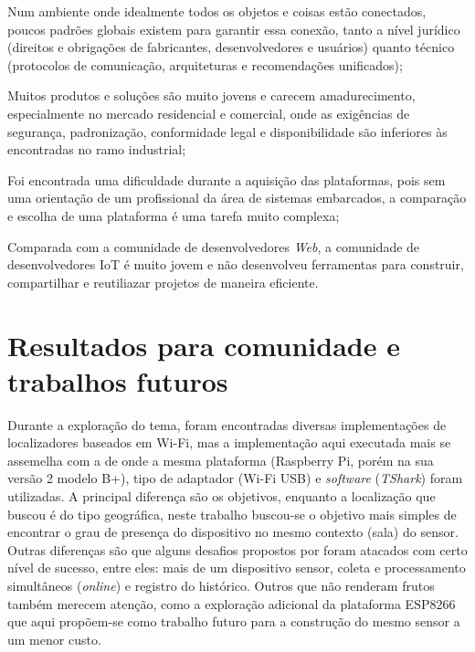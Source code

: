 \begin{alineas}
	\item Num ambiente onde
	idealmente todos os objetos e coisas estão conectados, poucos padrões globais
	existem para garantir essa conexão, tanto a nível jurídico (direitos e
	obrigações de fabricantes, desenvolvedores e usuários) quanto técnico
	(protocolos de comunicação, arquiteturas e recomendações unificados);

	\item Muitos produtos e soluções são muito jovens e carecem amadurecimento,
	especialmente no mercado residencial e comercial, onde as exigências de
	segurança, padronização, conformidade legal e disponibilidade são inferiores
	às encontradas no ramo industrial;

	\item Foi encontrada uma dificuldade durante a aquisição das plataformas, pois
	sem uma orientação de um profissional da área de sistemas embarcados, a
	comparação e escolha de uma plataforma é uma tarefa muito complexa;

	\item Comparada com a comunidade de desenvolvedores \emph{Web}, a comunidade
	de desenvolvedores IoT é muito jovem e não desenvolveu ferramentas para
	construir, compartilhar e reutiliazar projetos de maneira eficiente.
\end{alineas}


\section{Resultados para comunidade e trabalhos futuros}
\label{sec:trab-futuros}

Durante a exploração do tema, foram encontradas diversas implementações de
localizadores baseados em Wi-Fi, mas a implementação aqui executada mais se
assemelha com a de  onde a mesma plataforma
(Raspberry Pi, porém na sua versão 2 modelo B+), tipo de adaptador (Wi-Fi USB)
e \emph{software} (\emph{TShark}) foram utilizadas. A principal diferença são os
objetivos, enquanto a localização que  buscou é do tipo
geográfica, neste trabalho buscou-se o objetivo mais simples de encontrar o grau
de presença do dispositivo no mesmo contexto (sala) do sensor. Outras diferenças
são que alguns desafios propostos por  foram atacados
com certo nível de sucesso, entre eles: mais de um dispositivo sensor,
coleta e processamento simultâneos (\emph{online}) e registro do histórico.
Outros que não renderam frutos também merecem atenção, como a exploração
adicional da plataforma ESP8266 que aqui propõem-se como trabalho futuro para a
construção do mesmo sensor a um menor custo.

